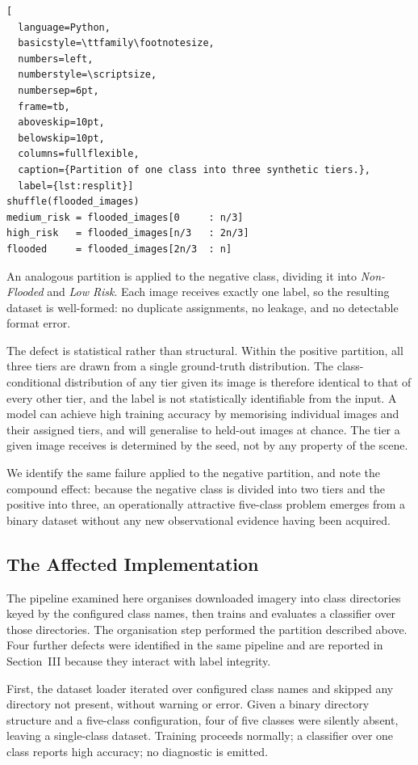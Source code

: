 \documentclass[11pt,journal]{IEEEtran}
\begin{document}
\begin{lstlisting}[
  language=Python,
  basicstyle=\ttfamily\footnotesize,
  numbers=left,
  numberstyle=\scriptsize,
  numbersep=6pt,
  frame=tb,
  aboveskip=10pt,
  belowskip=10pt,
  columns=fullflexible,
  caption={Partition of one class into three synthetic tiers.},
  label={lst:resplit}]
shuffle(flooded_images)
medium_risk = flooded_images[0     : n/3]
high_risk   = flooded_images[n/3   : 2n/3]
flooded     = flooded_images[2n/3  : n]
\end{lstlisting}

An analogous partition is applied to the negative class, dividing it into
\emph{Non-Flooded} and \emph{Low Risk}. Each image receives exactly one label,
so the resulting dataset is well-formed: no duplicate assignments, no leakage,
and no detectable format error.

The defect is statistical rather than structural. Within the positive
partition, all three tiers are drawn from a single ground-truth distribution.
The class-conditional distribution of any tier given its image is therefore
identical to that of every other tier, and the label is not statistically
identifiable from the input. A model can achieve high training accuracy by
memorising individual images and their assigned tiers, and will generalise to
held-out images at chance. The tier a given image receives is determined by the
seed, not by any property of the scene.

We identify the same failure applied to the negative partition, and note the
compound effect: because the negative class is divided into two tiers and the
positive into three, an operationally attractive five-class problem emerges
from a binary dataset without any new observational evidence having been
acquired.

\subsection{The Affected Implementation}

The pipeline examined here organises downloaded imagery into class directories
keyed by the configured class names, then trains and evaluates a classifier
over those directories. The organisation step performed the partition described
above. Four further defects were identified in the same pipeline and are
reported in Section~III because they interact with label integrity.

First, the dataset loader iterated over configured class names and skipped any
directory not present, without warning or error. Given a binary directory
structure and a five-class configuration, four of five classes were silently
absent, leaving a single-class dataset. Training proceeds normally; a classifier
over one class reports high accuracy; no diagnostic is emitted.
\end{document}
